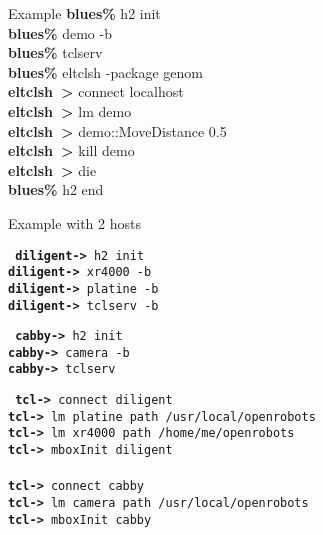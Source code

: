 \documentclass[a4paper,landscape,smooth]{show}
\begin{document}
\begin{tslide}{Example}
\vfill
{\bf blues\% } h2 init\\
{\bf blues\% } demo -b\\
{\bf blues\% } tclserv\\
{\bf blues\% } eltclsh -package genom\\
{\bf eltclsh~>} connect localhost\\
{\bf eltclsh~>} lm demo\\
{\bf eltclsh~>} demo::MoveDistance 0.5\\
{\bf eltclsh~>} kill demo\\
{\bf eltclsh~>} die\\
{\bf blues\%} h2 end\\
\vfill
\end{tslide}
\begin{tslide}{Example with 2 hosts}
   \vfill
   \parbox{0.45\linewidth}{\tt
      {\bf diligent->} h2 init\\
      {\bf diligent->} xr4000 -b\\
      {\bf diligent->} platine -b\\
      {\bf diligent->} tclserv -b\\
   }\hfill\parbox{0.45\linewidth}{\tt
      {\bf cabby->} h2 init\\
      {\bf cabby->} camera -b\\
      {\bf cabby->} tclserv\\
   }
   \vfill
   {\tt
      {\bf tcl->} connect diligent\\
      {\bf tcl->} lm platine path /usr/local/openrobots\\
      {\bf tcl->} lm xr4000 path /home/me/openrobots\\
      {\bf tcl->} mboxInit diligent\\
\\
      {\bf tcl->} connect cabby\\
      {\bf tcl->} lm camera path /usr/local/openrobots\\
      {\bf tcl->} mboxInit cabby\\
   }
   \vfill
\end{tslide}

\end{document}
